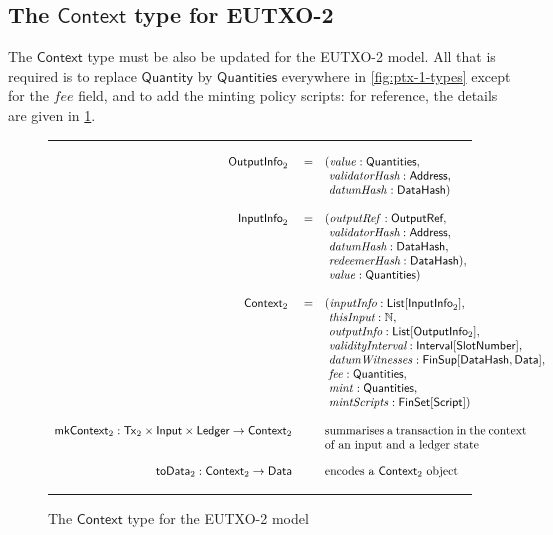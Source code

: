 \documentclass[a4paper]{article}
\renewcommand{\i}{\textit}  %
\newcommand{\s}{\textsf}  %
\newcommand{\msf}[1]{\ensuremath{\mathsf{#1}}}
\newcommand{\mi}[1]{\ensuremath{\mathit{#1}}}
\newcommand\rfskip{7pt}
\newenvironment{ruledfigure}[1]{\begin{figure}[#1]\hrule\vspace{\rfskip}}{\vspace{\rfskip}\hrule\end{figure}}
\newcommand{\List}[1]{\ensuremath{\s{List}[#1]}}
\newcommand{\FinSet}[1]{\ensuremath{\s{FinSet}[#1]}}
\newcommand{\Interval}[1]{\ensuremath{\s{Interval}[#1]}}
\newcommand{\FinSup}[2]{\ensuremath{\s{FinSup}[#1,#2]}}
\newcommand{\script}{\ensuremath{\s{Script}}}
\newcommand{\ctx}{\ensuremath{\s{Context}}}
\newcommand{\toData}{\ensuremath{\s{toData}}}
\newcommand{\mkContext}{\ensuremath{\s{mkContext}}}
\newcommand{\Address}{\ensuremath{\s{Address}}}
\newcommand{\DataHash}{\ensuremath{\s{DataHash}}}
\newcommand{\mint}{\mi{mint}}
\newcommand{\mintScripts}{\mi{mintScripts}}
\newcommand{\fee}{\mi{fee}}
\newcommand{\val}{\mi{value}}  %
\newcommand{\datumHash}{\mi{datumHash}}
\newcommand{\datumWits}{\mi{datumWitnesses}}
\newcommand{\Data}{\ensuremath{\s{Data}}}
\newcommand{\outputref}{\mi{outputRef}}
\newcommand{\slotnum}{\ensuremath{\s{SlotNumber}}}
\newcommand{\eutxotx}{\msf{Tx}}
\newcommand{\qty}{\ensuremath{\s{Quantity}}}
\newcommand{\qtymap}{\ensuremath{\s{Quantities}}}
\newcommand\N{\ensuremath{\mathbb{N}}}
\begin{document}
\subsection{The \ctx{} type for EUTXO-2}
\label{sec:pendingtx-2}
The \ctx{} type must be also be updated for the EUTXO-2 model.  All
that is required is to replace \qty{} by \qtymap{} everywhere in
\cref{fig:ptx-1-types} except for the \fee{} field, and to add the
minting policy scripts: for reference, the details are given in
\cref{fig:ptx-2-types}.
\begin{ruledfigure}{H}
  \begin{displaymath}
  \begin{array}{rll}
    \s{OutputInfo}_2\s{ } &=&(\val: \qtymap,\\
                          & &\ \i{validatorHash}: \Address,\\
                          & &\ \datumHash: \DataHash)\\
    \\
    \s{InputInfo}_2\s{ } &=& (\outputref: \s{OutputRef},\\
                         & &\ \i{validatorHash}: \Address,\\
                         & &\ \i{datumHash}: \DataHash,\\
                         & &\ \i{redeemerHash}: \DataHash),\\
                         & &\ \val: \qtymap)\\
     \\
     \ctx_2\s{ } &=&(\i{inputInfo}: \List{\s{InputInfo}_2},\\
                 & &\ \i{thisInput}: \N,\\
                 & &\ \i{outputInfo}: \List{\s{OutputInfo$_2$}},\\
                 & &\ \i{validityInterval}: \Interval{\slotnum},\\
                 & &\ \datumWits: \FinSup{\DataHash}{\Data},\\
                 & &\ \fee: \qtymap,\\
                 & &\ \mint: \qtymap,\\
                 & &\ \mintScripts: \FinSet{\script})\\
    \\
    \mkContext_2: \eutxotx_2 \times \s{Input} \times \s{Ledger} \rightarrow \ctx_2 &&
      \mbox{\parbox[t]{6cm}{summarises a transaction in the context of an input and a ledger state}}\\
     \\
     \toData_2: \ctx_2 \rightarrow \Data &~& \mbox{encodes a $\ctx_2$ object}\\
  \end{array}
  \end{displaymath}
  \caption{The \ctx{} type for the EUTXO-2 model}
  \label{fig:ptx-2-types}
\end{ruledfigure}
\end{document}
